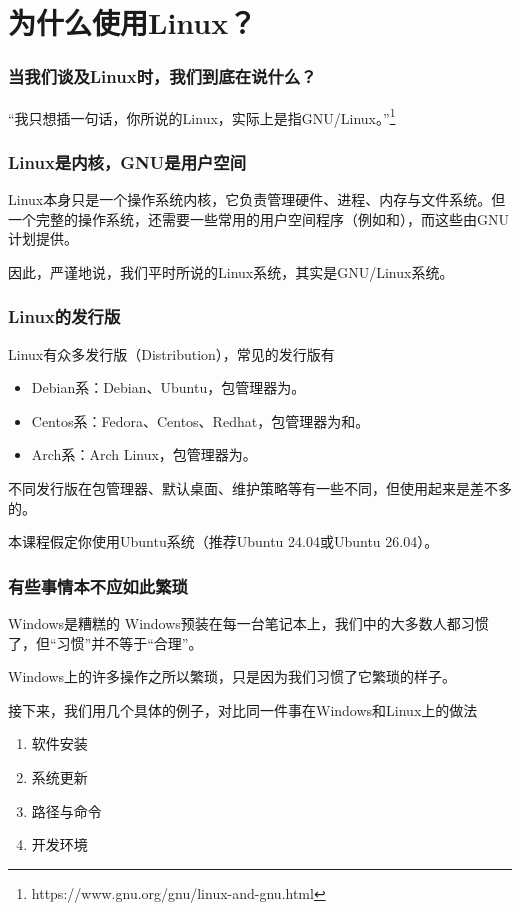 \section{为什么使用Linux？}

\begin{frame}
    \frametitle{当我们谈及Linux时，我们到底在说什么？}
    \begin{center}
        “我只想插一句话，你所说的Linux，实际上是指GNU/Linux。”\footnote{https://www.gnu.org/gnu/linux-and-gnu.html}
    \end{center}
\end{frame}

\begin{frame}
    \frametitle{Linux是内核，GNU是用户空间}
    Linux本身只是一个\alert{操作系统内核}，它负责管理硬件、进程、内存与文件系统。但一个完整的操作系统，还需要一些常用的\alert{用户空间程序}（例如和），而这些由GNU计划提供。

    因此，严谨地说，我们平时所说的Linux系统，其实是\alert{GNU/Linux}系统。
\end{frame}

\begin{frame}
    \frametitle{Linux的发行版}
    Linux有众多\alert{发行版}（Distribution），常见的发行版有
    \begin{itemize}
        \item Debian系：Debian、Ubuntu，包管理器为。
        \item Centos系：Fedora、Centos、Redhat，包管理器为和。
        \item Arch系：Arch Linux，包管理器为。
    \end{itemize}
    不同发行版在包管理器、默认桌面、维护策略等有一些不同，但使用起来是差不多的。

    \alert{本课程假定你使用Ubuntu系统}（推荐Ubuntu 24.04或Ubuntu 26.04）。
\end{frame}

\begin{frame}
    \frametitle{有些事情本不应如此繁琐}
    \begin{vspquote}{Windows是糟糕的}
        Windows预装在每一台笔记本上，我们中的大多数人都习惯了，但“习惯”并不等于“合理”。
        
        Windows上的许多操作之所以繁琐，只是因为我们习惯了它繁琐的样子。
    \end{vspquote}
    接下来，我们用几个具体的例子，对比同一件事在Windows和Linux上的做法
    \begin{enumerate}
        \item 软件安装
        \item 系统更新
        \item 路径与命令
        \item 开发环境
    \end{enumerate}
\end{frame}

